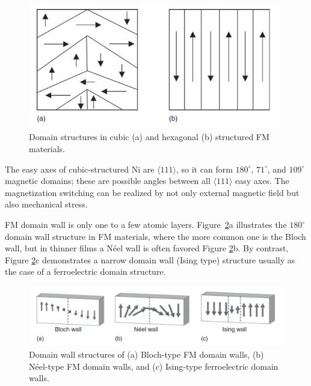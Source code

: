 \begin{figure}[H]
\centering
\captionsetup{justification=centering,margin=2cm}
	\includegraphics[width=110mm]{fig/review/domain_structure.png}
	\caption[Domain structures in cubic and FM materials.]{Domain structures in cubic (a) and hexagonal (b) structured FM materials.}
\label{fig:domain_structure}
\end{figure}

The easy axes of cubic-structured Ni are $\langle 111 \rangle$, so it can form $180 ^\circ$, $71 ^\circ$, and $109 ^\circ$ magnetic domains; these are possible angles between all $\langle 111 \rangle$ easy axes. The magnetization switching can be realized by not only external magnetic field but also mechanical stress.

FM domain wall is only one to a few atomic layers. Figure~\ref{fig:wall_structure}a illustrates the $180  ^\circ$ domain wall structure in FM materials, where the more common one is the Bloch wall, but in thinner films a Néel wall is often favored Figure \ref{fig:wall_structure}b. By contrast, Figure \ref{fig:wall_structure}c demonstrates a narrow domain wall (Ising type) structure usually as the case of a ferroelectric domain structure.

\begin{figure}[H]
\centering
\captionsetup{justification=centering,margin=2cm}
	\includegraphics[width=150mm]{fig/review/wall_structure.png}
	\caption[Domain wall structures.]{Domain wall structures of (a) Bloch-type FM domain walls, (b) Néel-type FM domain walls, and (c) Ising-type ferroelectric domain walls.}
\label{fig:wall_structure}
\end{figure}

